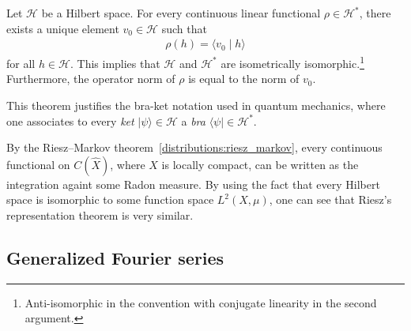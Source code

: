     \begin{theorem}\label{functional:riesz}
        Let $\mathcal{H}$ be a Hilbert space. For every continuous linear functional $\rho\in\mathcal{H}^*$, there exists a unique element $v_0\in\mathcal{H}$ such that
        \begin{gather}
            \rho(h) = \langle v_0\mid h\rangle
        \end{gather}
        for all $h\in\mathcal{H}$. This implies that $\mathcal{H}$ and $\mathcal{H}^*$ are isometrically isomorphic.\footnote{Anti-isomorphic in the convention with conjugate linearity in the second argument.} Furthermore, the operator norm of $\rho$ is equal to the norm of $v_0$.
    \end{theorem}
    \begin{remark}
        This theorem justifies the bra-ket notation used in quantum mechanics, where one associates to every \textit{ket} $\lvert\psi\rangle\in\mathcal{H}$ a \textit{bra} $\langle\psi\rvert\in\mathcal{H}^*$.
    \end{remark}

    \begin{remark}
        By the Riesz--Markov theorem~\ref{distributions:riesz_markov}, every continuous functional on $C(\widehat{X})$, where $X$ is locally compact, can be written as the integration againt some Radon measure. By using the fact that every Hilbert space is isomorphic to some function space $L^2(X,\mu)$, one can see that Riesz's representation theorem is very similar.
    \end{remark}

\subsection{Generalized Fourier series}

